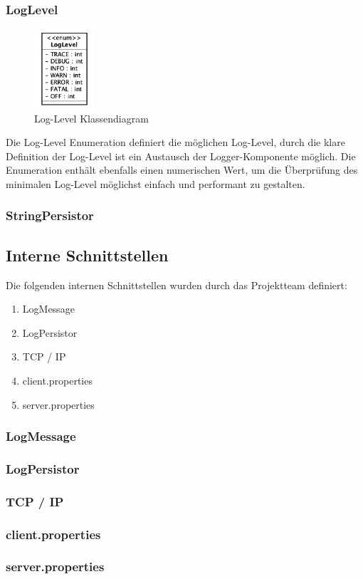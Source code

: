 \subsubsection{LogLevel}
\begin{figure}[H]
	\centering
	\includegraphics[width=0.2\textwidth]{3_Schnittstellen/Bilder/logLevel.png}
	\caption{Log-Level Klassendiagram}
	\label{fig:Log-Level Klassendiagramm}
\end{figure}
Die Log-Level Enumeration definiert die möglichen Log-Level, durch die klare Definition der Log-Level ist ein Austausch der Logger-Komponente möglich. Die Enumeration enthält ebenfalls einen numerischen Wert, um die Überprüfung des minimalen Log-Level möglichst einfach und performant zu gestalten.
\subsubsection{StringPersistor}

\subsection{Interne Schnittstellen}
Die folgenden internen Schnittstellen wurden durch das Projektteam definiert: 
\begin{enumerate}
	\item LogMessage
	\item LogPersistor
	\item TCP / IP
	\item client.properties
	\item server.properties
\end{enumerate}

\subsubsection{LogMessage}
\subsubsection{LogPersistor}
\subsubsection{TCP / IP}
\subsubsection{client.properties}
\subsubsection{server.properties}